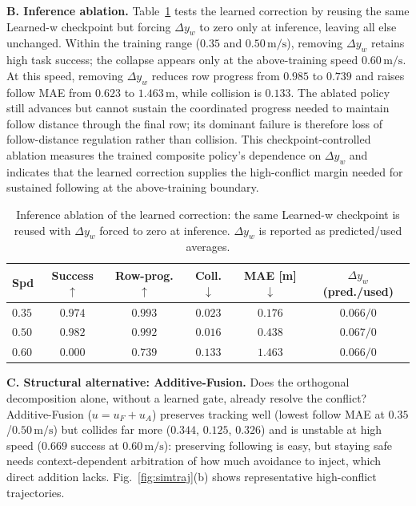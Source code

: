 \documentclass[letterpaper, 10 pt, conference]{ieeeconf}
\newcommand{\uF}{u_{F}}
\newcommand{\uA}{u_{A}}
\newcommand{\msec}{\,\mathrm{m/s}}
\begin{document}
\textbf{B. Inference ablation.}
Table~\ref{tab:mech} tests the learned correction by reusing the same
Learned-w checkpoint but forcing $\Delta y_w$ to zero only at inference,
leaving all else unchanged. Within the training range ($0.35$ and
$0.50\msec$), removing $\Delta y_w$ retains high task success; the collapse
appears only at the above-training speed
$0.60\msec$. At this speed, removing $\Delta y_w$ reduces row progress from
$0.985$ to $0.739$ and raises follow MAE from $0.623$ to
$1.463\,\mathrm{m}$, while collision is $0.133$. The ablated policy still
advances but cannot sustain the coordinated progress needed to maintain
follow distance through the final row; its dominant failure is therefore
loss of follow-distance regulation rather than collision. This
checkpoint-controlled ablation measures the trained composite policy's
dependence on $\Delta y_w$ and indicates that the learned correction supplies
the high-conflict margin needed for sustained following at the above-training
boundary.

\begin{table}[t]
\centering
\caption{Inference ablation of the learned correction: the same
Learned-w checkpoint is reused with $\Delta y_w$ forced to zero at
inference. $\Delta y_w$ is reported as predicted/used averages.}
\label{tab:mech}
\setlength{\tabcolsep}{2.5pt}
\scriptsize
\begin{tabular}{lccccc}
\toprule
Spd & Success $\uparrow$ & Row-prog. $\uparrow$ & Coll. $\downarrow$ & MAE [m] $\downarrow$ &
$\Delta y_w$ (pred./used) \\
\midrule
$0.35$ & $0.974$ & $0.993$ & $0.023$ & $0.176$ & $0.066/0$ \\
$0.50$ & $0.982$ & $0.992$ & $0.016$ & $0.438$ & $0.067/0$ \\
$0.60$ & $0.000$ & $0.739$ & $0.133$ & $1.463$ & $0.066/0$ \\
\bottomrule
\end{tabular}
\end{table}

\textbf{C. Structural alternative: Additive-Fusion.}
Does the orthogonal decomposition alone, without a learned gate, already
resolve the conflict? Additive-Fusion ($u=\uF+\uA$) preserves tracking well
(lowest follow MAE at $0.35$/$0.50\msec$) but collides far more ($0.344$,
$0.125$, $0.326$) and is unstable at high speed ($0.669$ success at
$0.60\msec$): preserving following is easy, but staying safe needs
context-dependent arbitration of how much avoidance to inject, which direct
addition lacks.
Fig.~\ref{fig:simtraj}(b) shows representative high-conflict trajectories.
\end{document}
